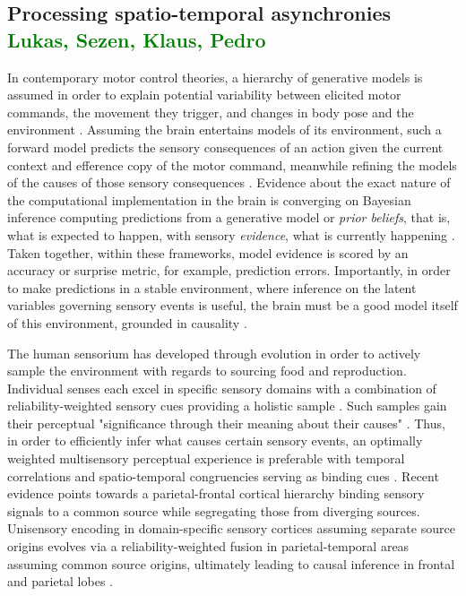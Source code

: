 \subsection{Processing spatio-temporal asynchronies \textcolor{green}{Lukas, Sezen, Klaus, Pedro}}
In contemporary motor control theories, a hierarchy of generative models is assumed in order to explain potential variability between elicited motor commands, the movement they trigger, and changes in body pose and the environment \cites{Wolpert2011, Shadmehr2010}. Assuming the brain entertains models of its environment, such a forward model predicts the sensory consequences of an action given the current context and efference copy of the motor command, meanwhile refining the models of the causes of those sensory consequences \cite{Pearson2011, Friston2010, Friston2016a}. Evidence about the exact nature of the computational implementation in the brain is converging on Bayesian inference computing predictions from a generative model or \textit{prior beliefs}, that is, what is expected to happen, with sensory \textit{evidence}, what is currently happening \cite{Knill2004}. Taken together, within these frameworks, model evidence is scored by an accuracy or surprise metric, for example, prediction errors. Importantly, in order to make predictions in a stable environment, where inference on the latent variables governing sensory events is useful, the brain must be a good model itself of this environment, grounded in causality \cite{Friston2016a}.

The human sensorium has developed through evolution in order to actively sample the environment with regards to sourcing food and reproduction. Individual senses each excel in specific sensory domains with a combination of reliability-weighted sensory cues providing a holistic sample \cite{Fetsch2012, Cao2019}. Such samples gain their perceptual "significance through their meaning about their causes" \cite{Kording2007}. Thus, in order to efficiently infer what causes certain sensory events, an optimally weighted multisensory perceptual experience is preferable with temporal correlations and spatio-temporal congruencies serving as binding cues \cite{Robertson2003}. Recent evidence points towards a parietal-frontal cortical hierarchy binding sensory signals to a common source while segregating those from diverging sources. Unisensory encoding in domain-specific sensory cortices assuming separate source origins evolves via a reliability-weighted fusion in parietal-temporal areas assuming common source origins, ultimately leading to causal inference in frontal and parietal lobes \cite{Cao2019, Rohe2019}.

